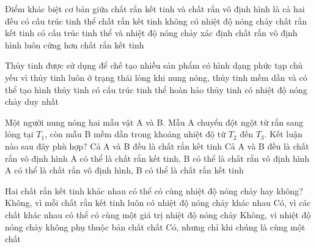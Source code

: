 \begin{ex}
Điểm khác biệt cơ bản giữa chất rắn kết tinh và chất rắn vô định hình là
\choice
{cả hai đều có cấu trúc tinh thể}
{chất rắn kết tinh không có nhiệt độ nóng chảy}
{\True chất rắn kết tinh có cấu trúc tinh thể và nhiệt độ nóng chảy xác định}
{chất rắn vô định hình luôn cứng hơn chất rắn kết tinh}
\end{ex}

\begin{ex}
Thủy tinh được sử dụng để chế tạo nhiều sản phẩm có hình dạng phức tạp chủ yếu vì
\choice
{thủy tinh luôn ở trạng thái lỏng}
{\True khi nung nóng, thủy tinh mềm dần và có thể tạo hình}
{thủy tinh có cấu trúc tinh thể hoàn hảo}
{thủy tinh có nhiệt độ nóng chảy duy nhất}
\end{ex}

\begin{ex}
Một người nung nóng hai mẫu vật A và B. Mẫu A chuyển đột ngột từ rắn sang lỏng tại $T_1$, còn mẫu B mềm dần trong khoảng nhiệt độ từ $T_2$ đến $T_3$. Kết luận nào sau đây phù hợp?
\choice
{Cả A và B đều là chất rắn kết tinh}
{Cả A và B đều là chất rắn vô định hình}
{\True A có thể là chất rắn kết tinh, B có thể là chất rắn vô định hình}
{A có thể là chất rắn vô định hình, B có thể là chất rắn kết tinh}
\end{ex}

\begin{ex}
Hai chất rắn kết tinh khác nhau có thể có cùng nhiệt độ nóng chảy hay không?
\choice
{Không, vì mỗi chất rắn kết tinh luôn có nhiệt độ nóng chảy khác nhau}
{\True Có, vì các chất khác nhau có thể có cùng một giá trị nhiệt độ nóng chảy}
{Không, vì nhiệt độ nóng chảy không phụ thuộc bản chất chất}
{Có, nhưng chỉ khi chúng là cùng một chất}
\end{ex}

